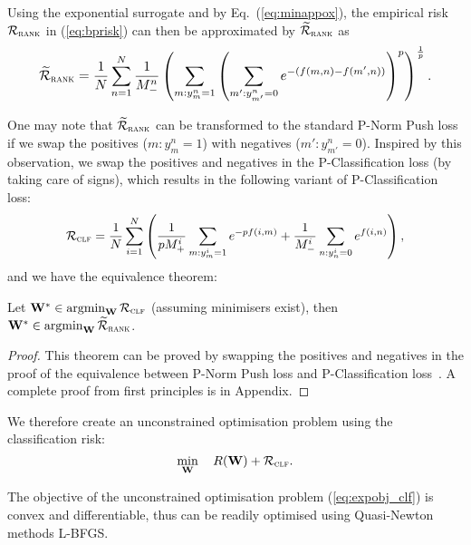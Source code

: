 Using the exponential surrogate and by Eq.~(\ref{eq:minappox}), the empirical risk $\mathcal{R}_\textsc{rank}$ in (\ref{eq:bprisk}) 
can then be approximated by $\widetilde{\mathcal{R}}_\textsc{rank}$ as
\begin{equation}
\label{eq:rankapprox}
\resizebox{.9\linewidth}{!}{$
\begin{aligned}
\widetilde\RCal_\textsc{rank}
= \frac{1}{N} \sum_{n=1}^N \frac{1}{M_-^n} \left( \sum_{m: y_m^n = 1} \left( \sum_{m': y_{m'}^n = 0} 
  e^{-(f(m, n) - f(m', n))} \right)^p \right)^\frac{1}{p}.
\end{aligned}
$}
\end{equation}

One may note that $\widetilde{\mathcal{R}}_\textsc{rank}$ can be transformed to the standard P-Norm Push loss if we swap the
positives ($m: y_m^n = 1$) with negatives ($m': y_{m'}^n = 0$). %
Inspired by this observation, we swap the positives and negatives in the P-Classification loss (by taking care of signs),
which results in the following variant of P-Classification loss:
\begin{equation*}
\mathcal{R}_\textsc{clf}
= \frac{1}{N} \sum_{i=1}^N \left(
  \frac{1}{p M_+^i} \sum_{m: y_m^i = 1} e^{-p f(i, m)}
  + \frac{1}{M_-^i} \sum_{n: y_n^i = 0} e^{f(i, n)} \right),
\end{equation*}
and we have the equivalence theorem:
\begin{theorem}
\label{th:rank2clf}
Let $\mathbf{W}^* \in \operatorname*{argmin}_{\mathbf{W}} \mathcal{R}_\textsc{clf}$ (assuming minimisers exist),
then $\mathbf{W}^* \in \operatorname*{argmin}_{\mathbf{W}} \widetilde{\mathcal{R}}_\textsc{rank}$.
\end{theorem}

\begin{proof}
This theorem can be proved by swapping the positives and negatives in the proof of 
the equivalence between P-Norm Push loss and P-Classification loss~\cite{ertekin2011equivalence}.
A complete proof from first principles is in Appendix.
\end{proof}

We therefore create an unconstrained optimisation problem using the classification risk:
\begin{equation}
\label{eq:expobj_clf}
\min_{\mathbf{W}} \quad R(\mathbf{W}) + \mathcal{R}_\textsc{clf}.
\end{equation}

The objective of the unconstrained optimisation problem (\ref{eq:expobj_clf}) is convex and differentiable,
thus can be readily optimised using Quasi-Newton methods \eg L-BFGS.

